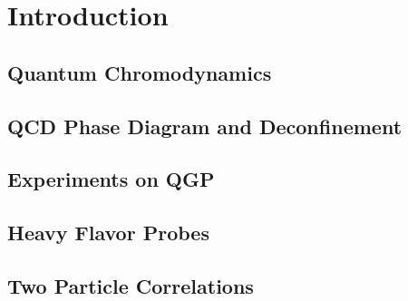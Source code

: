 \chapter{Introduction}

\section{Quantum Chromodynamics}

\section{QCD Phase Diagram and Deconfinement}

\section{Experiments on QGP}

\section{Heavy Flavor Probes}

\section{Two Particle Correlations}
